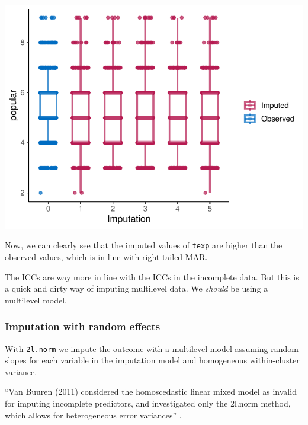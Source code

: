 \documentclass[
]{jss}
\begin{document}
\begin{CodeChunk}


\begin{center}\includegraphics{Imputation_of_Incomplete_Multilevel_Data_files/figure-latex/pop_predictor_eval-1} \end{center}

\end{CodeChunk}

Now, we can clearly see that the imputed values of \texttt{texp} are
higher than the observed values, which is in line with right-tailed MAR.

The ICCs are way more in line with the ICCs in the incomplete data. But
this is a quick and dirty way of imputing multilevel data. We
\emph{should} be using a multilevel model.

\hypertarget{imputation-with-random-effects}{%
\subsubsection{Imputation with random
effects}\label{imputation-with-random-effects}}

With \texttt{2l.norm} we impute the outcome with a multilevel model
assuming random slopes for each variable in the imputation model and
homogeneous within-cluster variance.

``Van Buuren (2011) considered the homoscedastic linear mixed model as
invalid for imputing incomplete predictors, and investigated only the
2l.norm method, which allows for heterogeneous error variances''
\citep{buur18}.
\end{document}
